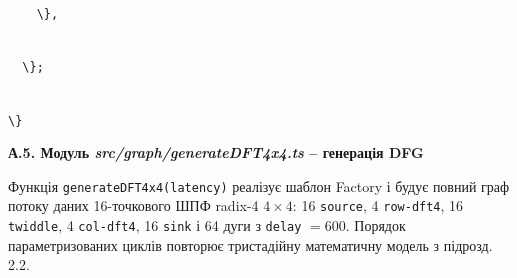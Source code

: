 \documentclass[
]{article}
\newcommand{\passthrough}[1]{#1}
\begin{document}
\passthrough{\lstinline!    !}\passthrough{\lstinline!\},!}\strut \\
\passthrough{\lstinline!  !}\passthrough{\lstinline!\};!}\strut \\
\passthrough{\lstinline!\}!}

\textbf{А.5. Модуль \emph{src/graph/generateDFT4x4.ts} -- генерація DFG}

Функція
\passthrough{\lstinline!generateDFT!}\passthrough{\lstinline!4!}\passthrough{\lstinline!x!}\passthrough{\lstinline!4(!}\passthrough{\lstinline!latency!}\passthrough{\lstinline!)!}
реалізує шаблон Factory і будує повний граф потоку даних 16-точкового
ШПФ radix-4 \(4 \times 4\): 16 \passthrough{\lstinline!source!}, 4
\passthrough{\lstinline!row!}\passthrough{\lstinline!-!}\passthrough{\lstinline!dft!}\passthrough{\lstinline!4!},
16 \passthrough{\lstinline!twiddle!}, 4
\passthrough{\lstinline!col!}\passthrough{\lstinline!-!}\passthrough{\lstinline!dft!}\passthrough{\lstinline!4!},
16 \passthrough{\lstinline!sink!} і 64 дуги з
\passthrough{\lstinline!delay!} \(= 600\). Порядок параметризованих
циклів повторює тристадійну математичну модель з підрозд. 2.2.
\end{document}
